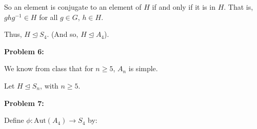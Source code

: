 \documentclass[a4paper,12pt]{article}
\newcommand{\tab}{\hspace{4mm}} %
\newcommand{\shunt}{\vspace{20mm}}
\newcommand{\subgp}{\mathrel{\unlhd}}
\begin{document}
\tab So an element is conjugate to an element of $H$ if and only if it is in $H$. That is, $ghg^{-1} \in H$ for all $g \in G$, $h \in H$.

Thus, $H \subgp S_4$. (And so, $H \subgp A_4$).

\shunt

{\bf Problem 6:}

We know from class that for $n \geq 5$, $A_n$ is simple.

Let $H \subgp S_n$, with $n \geq 5$.

\shunt

{\bf Problem 7:}

Define $\phi: \text{Aut}(A_4) \to S_4$ by:


\shunt
\end{document}
